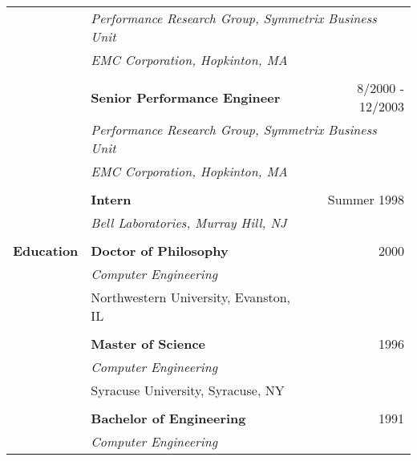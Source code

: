 \documentclass[10pt]{article}
\begin{document}
\begin{longtable}{p{ 90pt}p{299pt}r}
                      & \multicolumn{2}{p{4.5in}}{\em Performance Research Group, Symmetrix Business Unit} \\
                      & {\em EMC Corporation, Hopkinton, MA} \\
\\
                      & {\bf Senior Performance Engineer} & {8/2000 - 12/2003}\\
                      & \multicolumn{2}{p{4.5in}}{\em Performance Research Group, Symmetrix Business Unit} \\
                      & {\em EMC Corporation, Hopkinton, MA} \\
\\
                      & {\bf Intern} & {Summer 1998}\\
                      & {\em Bell Laboratories, Murray Hill, NJ} \\
\\
{\bf Education}       & {\bf Doctor of Philosophy} & 2000\\
                      & {\em Computer Engineering} \\
                      & {Northwestern University, Evanston, IL} \\
\\
                      & {\bf Master of Science} & 1996\\
                      & {\em Computer Engineering} \\
	              & {Syracuse University, Syracuse, NY} \\
\\
                      & {\bf Bachelor of Engineering} & 1991\\
                      & {\em Computer Engineering} \\

\end{longtable}
\end{document}
